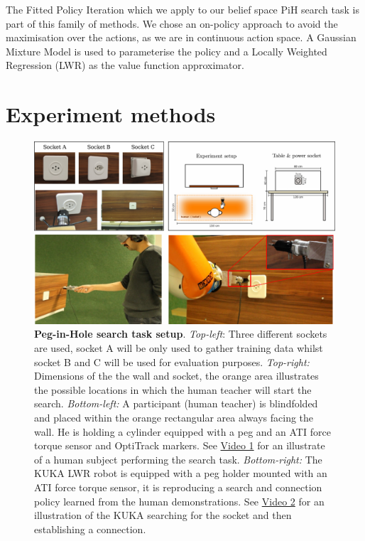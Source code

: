 \documentclass[final,5p,times,twocolumn]{elsarticle}
\begin{document}
The Fitted Policy Iteration which we apply to our belief space PiH search task is part of this family of methods.
We chose an on-policy approach to avoid the maximisation over the actions, as we are in continuous action space.
A Gaussian Mixture Model is used to parameterise the policy and a Locally Weighted Regression (LWR) as 
the value function approximator.

\section{Experiment methods}\label{sec:experiment_methods}

\begin{figure}
 \centering
 \includegraphics[width=0.85\linewidth]{./Figure/Figure1.pdf}
 \caption{\textbf{Peg-in-Hole search task setup}.
  \textit{Top-left}: Three different sockets are used, socket A will be only used to gather training data whilst socket B and 
  C will be used for evaluation purposes.  \textit{Top-right:} Dimensions of the the wall and socket, the orange area illustrates the possible locations 
  in which the human teacher will start the search.
  \textit{Bottom-left:} A participant (human teacher) is blindfolded and  placed within the orange rectangular area always 
  facing the wall. He is holding a cylinder equipped with a peg and an  ATI force torque sensor and OptiTrack markers. See \href{http://lasa.epfl.ch/videos/gpldecha/pih-search/human_search.wmv}{Video 1} for 
  an illustrate of a human subject performing the search task.
  \textit{Bottom-right:} The KUKA LWR robot is equipped with a peg holder mounted with an ATI force torque sensor, it is reproducing a search 
  and connection policy learned from the human demonstrations. See \href{http://lasa.epfl.ch/videos/gpldecha/pih-search/KUKA_pih-search.wmv}{Video 2} for an illustration of the KUKA searching for the socket and then 
  establishing a connection.}
    \label{fig:search_task_setup}
\end{figure}
\end{document}
